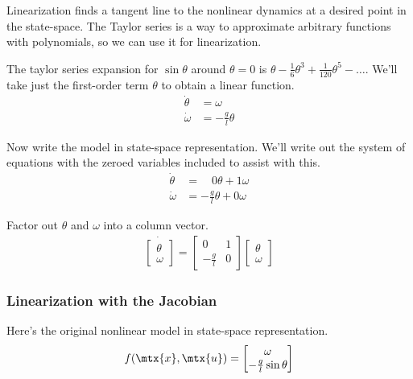 Linearization finds a tangent line to the nonlinear dynamics at a desired point
in the state-space. The Taylor series is a way to approximate arbitrary
functions with polynomials, so we can use it for linearization.

The taylor series expansion for $\sin\theta$ around $\theta = 0$ is
$\theta - \frac{1}{6} \theta^3 + \frac{1}{120} \theta^5 - \ldots$. We'll take
just the first-order term $\theta$ to obtain a linear function.
\begin{align*}
  \dot{\theta} &= \omega \\
  \dot{\omega} &= -\frac{g}{l} \theta
\end{align*}

Now write the \gls{model} in state-space representation. We'll write out the
system of equations with the zeroed variables included to assist with this.
\begin{align*}
  \dot{\theta} &= \;\;\;\,0 \theta + 1 \omega \\
  \dot{\omega} &= -\frac{g}{l} \theta + 0 \omega
\end{align*}

Factor out $\theta$ and $\omega$ into a column vector.
\begin{align}
  \dot{
  \begin{bmatrix}
    \theta \\
    \omega
  \end{bmatrix}} =
  \begin{bmatrix}
    0 & 1 \\
    -\frac{g}{l} & 0
  \end{bmatrix}
  \begin{bmatrix}
    \theta \\
    \omega
  \end{bmatrix}
\end{align}

\subsubsection{Linearization with the Jacobian}

Here's the original nonlinear model in state-space representation.
\begin{equation*}
  f(\mtx{x}, \mtx{u}) =
  \begin{bmatrix}
    \omega \\
    -\frac{g}{l}\sin\theta
  \end{bmatrix}
\end{equation*}

